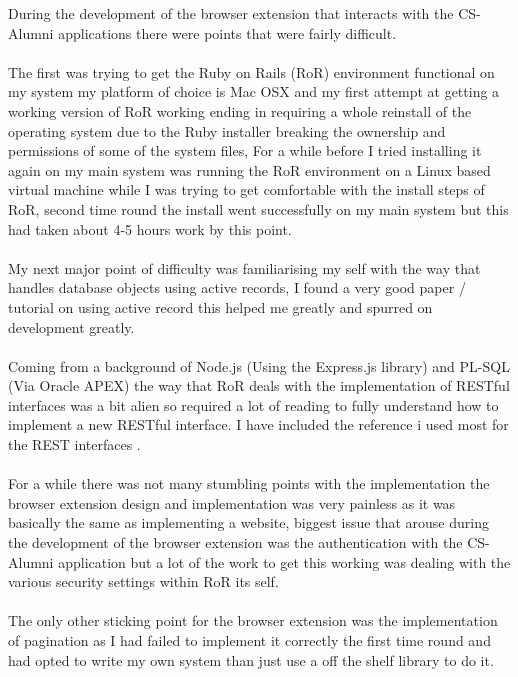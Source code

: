 \documentclass{article}
\begin{document}
During the development of the browser extension that interacts with the CS-Alumni applications there were points that were fairly difficult.\\
\\
The first was trying to get the Ruby on Rails (RoR) environment functional on my system my platform of choice is Mac OSX and my first attempt at getting a working version of RoR working ending in requiring a whole reinstall of the operating system due to the Ruby installer breaking the ownership and permissions of some of the system files, For a while before I tried installing it again on my main system was running the RoR environment on a Linux based virtual machine while I was trying to get comfortable with the install steps of RoR, second time round the install went successfully on my main system but this had taken about 4-5 hours work by this point.\\
\\
My next major point of difficulty was familiarising my self with the way that handles database objects using active records, I found a very good paper / tutorial on using active record \cite[see reference][page \pageref{LastPage}]{saa:2013:online} this helped me greatly and spurred on development greatly.\\
\\
Coming from a background of Node.js (Using the Express.js library) and PL-SQL (Via Oracle APEX) the way that RoR deals with the implementation of RESTful interfaces was a bit alien so required a lot of reading to fully understand how to implement a new RESTful interface. I have included the reference i used most for the REST interfaces \cite[see reference][page \pageref{LastPage}]{bara:2013:online}.\\
\\
For a while there was not many stumbling points with the implementation the browser extension design and implementation was very painless as it was basically the same as implementing a website, biggest issue that arouse during the development of the browser extension was the authentication with the CS-Alumni application but a lot of the work to get this working was dealing with the various security settings within RoR its self.\\
\\
The only other sticking point for the browser extension was the implementation of pagination as I had failed to implement it correctly the first time round and had opted to write my own system than just use a off the shelf library to do it.\\
\end{document}
